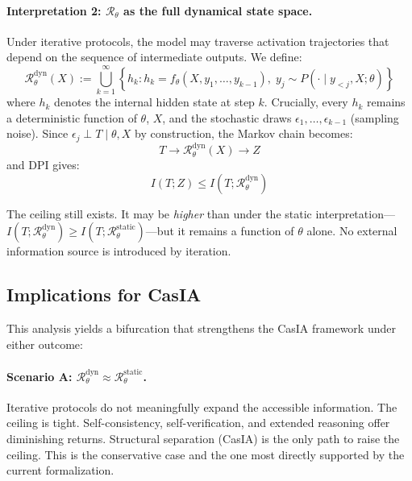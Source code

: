 \documentclass[11pt,a4paper]{article}
\theoremstyle{remark}
\begin{document}
\paragraph{Interpretation 2: $\mathcal{R}_\theta$ as the full dynamical state space.} Under iterative protocols, the model may traverse activation trajectories that depend on the sequence of intermediate outputs. We define:
\begin{equation}
  \mathcal{R}_\theta^{\mathrm{dyn}}(X) := \bigcup_{k=1}^{\infty} \left\{ h_k : h_k = f_\theta(X, y_1, \ldots, y_{k-1}), \; y_j \sim P(\cdot \mid y_{<j}, X; \theta) \right\}
\end{equation}
where $h_k$ denotes the internal hidden state at step $k$. Crucially, every $h_k$ remains a deterministic function of $\theta$, $X$, and the stochastic draws $\epsilon_1, \ldots, \epsilon_{k-1}$ (sampling noise). Since $\epsilon_j \perp T \mid \theta, X$ by construction, the Markov chain becomes:
\begin{equation}
  T \to \mathcal{R}_\theta^{\mathrm{dyn}}(X) \to Z
\end{equation}
and DPI gives:
\begin{equation}
  I(T; Z) \leq I(T; \mathcal{R}_\theta^{\mathrm{dyn}})
\end{equation}

The ceiling still exists. It may be \emph{higher} than under the static interpretation---$I(T; \mathcal{R}_\theta^{\mathrm{dyn}}) \geq I(T; \mathcal{R}_\theta^{\mathrm{static}})$---but it remains a function of $\theta$ alone. No external information source is introduced by iteration.

\subsection{Implications for CasIA}

This analysis yields a bifurcation that strengthens the CasIA framework under either outcome:

\paragraph{Scenario A: $\mathcal{R}_\theta^{\mathrm{dyn}} \approx \mathcal{R}_\theta^{\mathrm{static}}$.} Iterative protocols do not meaningfully expand the accessible information. The ceiling is tight. Self-consistency, self-verification, and extended reasoning offer diminishing returns. Structural separation (CasIA) is the only path to raise the ceiling. This is the conservative case and the one most directly supported by the current formalization.
\end{document}
